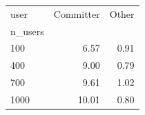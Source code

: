 \begin{tabular}{lrr}
\toprule
user & Committer & Other \\
n_users &  &  \\
\midrule
100 & 6.57 & 0.91 \\
400 & 9.00 & 0.79 \\
700 & 9.61 & 1.02 \\
1000 & 10.01 & 0.80 \\
\bottomrule
\end{tabular}
